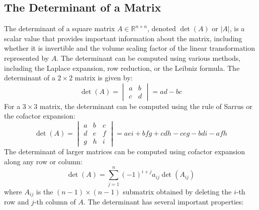\subsection{The Determinant of a Matrix}
The determinant of a square matrix $A \in \mathbb{R}^{n \times n}$, denoted $\det(A)$ or $|A|$, is a scalar value that provides important information about the matrix, including whether it is invertible and the volume scaling factor of the linear transformation represented by $A$.
The determinant can be computed using various methods, including the Laplace expansion, row reduction, or the Leibniz formula.
The determinant of a $2 \times 2$ matrix is given by:
\begin{equation*}
\det(A) =
\begin{vmatrix}
a & b \\
c & d
\end{vmatrix}
= ad - bc
\end{equation*}
For a $3 \times 3$ matrix, the determinant can be computed using the rule of Sarrus or the cofactor expansion:
\begin{equation*}
\det(A) =
\begin{vmatrix}
a & b & c \\
d & e & f \\
g & h & i
\end{vmatrix}
= aei + bfg + cdh - ceg - bdi - afh
\end{equation*}
The determinant of larger matrices can be computed using cofactor expansion along any row or column:
\begin{equation*}
\det(A) = \sum_{j=1}^{n} (-1)^{i+j} a_{ij} \det(A_{ij})
\end{equation*}
where $A_{ij}$ is the $(n-1) \times (n-1)$ submatrix obtained by deleting the $i$-th row and $j$-th column of $A$.
The determinant has several important properties:
